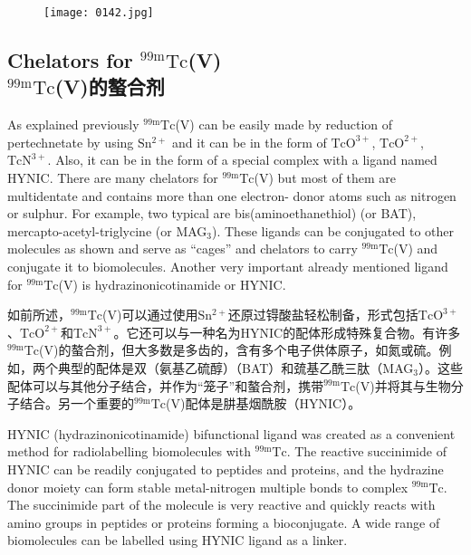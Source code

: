 \documentclass[dvipsnames, svgnames,a4paper,11pt]{article}
\begin{document}
\begin{figure}[h]
	\centering
    \texttt{[image: 0142.jpg]}    
     \label{fig149}
\end{figure}

\subsection{Chelators for ${}^\mathrm{99m}\mathrm{Tc}$(V) \\${}^\mathrm{99m}\mathrm{Tc}$(V)的螯合剂}

As explained previously ${}^\mathrm{99m}\mathrm{Tc}$(V) can be easily made by reduction of pertechnetate
by using $\mathrm{Sn^{2+}}$ and it can be in the form of $\mathrm{TcO^{3+}}$, $\mathrm{TcO^{2+}}$, $\mathrm{TcN^{3+}}$. Also, it can be in the
form of a special complex with a ligand named HYNIC. There are many chelators for
${}^\mathrm{99m}\mathrm{Tc}$(V) but most of them are multidentate and contains more than one electron-
donor atoms such as nitrogen or sulphur. For example, two typical are
bis(aminoethanethiol) (or BAT), mercapto-acetyl-triglycine (or MAG${}_3$). These ligands
can be conjugated to other molecules as shown and serve as “cages” and chelators
to carry ${}^\mathrm{99m}\mathrm{Tc}$(V) and conjugate it to biomolecules. Another very important already
mentioned ligand for ${}^\mathrm{99m}\mathrm{Tc}$(V) is hydrazinonicotinamide or HYNIC.

如前所述，${}^\mathrm{99m}\mathrm{Tc}$(V)可以通过使用$\mathrm{Sn^{2+}}$还原过锝酸盐轻松制备，形式包括$\mathrm{TcO^{3+}}$、$\mathrm{TcO^{2+}}$和$\mathrm{TcN^{3+}}$。它还可以与一种名为HYNIC的配体形成特殊复合物。有许多${}^\mathrm{99m}\mathrm{Tc}$(V)的螯合剂，但大多数是多齿的，含有多个电子供体原子，如氮或硫。例如，两个典型的配体是双（氨基乙硫醇）（BAT）和巯基乙酰三肽（MAG${}_3$）。这些配体可以与其他分子结合，并作为“笼子”和螯合剂，携带${}^\mathrm{99m}\mathrm{Tc}$(V)并将其与生物分子结合。另一个重要的${}^\mathrm{99m}\mathrm{Tc}$(V)配体是肼基烟酰胺（HYNIC）。

HYNIC (hydrazinonicotinamide) bifunctional ligand was created as a convenient
method for radiolabelling biomolecules with ${}^\mathrm{99m}\mathrm{Tc}$. The reactive succinimide of HYNIC can be readily conjugated to peptides and proteins, and the hydrazine donor
moiety can form stable metal-nitrogen multiple bonds to complex ${}^\mathrm{99m}\mathrm{Tc}$. The
succinimide part of the molecule is very reactive and quickly reacts with amino
groups in peptides or proteins forming a bioconjugate. A wide range of biomolecules
can be labelled using HYNIC ligand as a linker.
\end{document}
